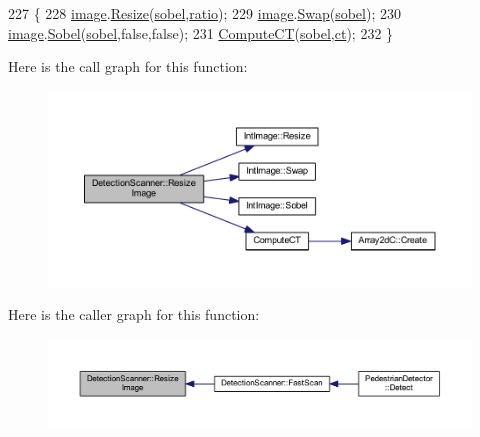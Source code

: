 \begin{DoxyCode}
227 \{
228     \mbox{\hyperlink{class_detection_scanner_aa4e4cfa6cc0a2ffd044c6cd9721a6b59}{image}}.\mbox{\hyperlink{class_int_image_a6eb852d06d8365476dba0760d9319e59}{Resize}}(\mbox{\hyperlink{class_detection_scanner_a03bc015aac34a51133881b760b929a6b}{sobel}},\mbox{\hyperlink{class_detection_scanner_a2ac93d1b6aca1959d57133c08b0eaa1c}{ratio}});
229     \mbox{\hyperlink{class_detection_scanner_aa4e4cfa6cc0a2ffd044c6cd9721a6b59}{image}}.\mbox{\hyperlink{class_int_image_adc366f59865cefd440c01996fd42d59a}{Swap}}(\mbox{\hyperlink{class_detection_scanner_a03bc015aac34a51133881b760b929a6b}{sobel}});
230     \mbox{\hyperlink{class_detection_scanner_aa4e4cfa6cc0a2ffd044c6cd9721a6b59}{image}}.\mbox{\hyperlink{class_int_image_a35b8a5c2e64fa3ab50d6b14973f368b8}{Sobel}}(\mbox{\hyperlink{class_detection_scanner_a03bc015aac34a51133881b760b929a6b}{sobel}},\textcolor{keyword}{false},\textcolor{keyword}{false});
231     \mbox{\hyperlink{c4-pedestrian-detector_8cpp_a205804b2ee8558313222a898513a9543}{ComputeCT}}(\mbox{\hyperlink{class_detection_scanner_a03bc015aac34a51133881b760b929a6b}{sobel}},\mbox{\hyperlink{class_detection_scanner_a885861d4c08a9f9ae4da36f68866419b}{ct}});
232 \}
\end{DoxyCode}
Here is the call graph for this function\+:\nopagebreak
\begin{figure}[H]
\begin{center}
\leavevmode
\includegraphics[width=350pt]{class_detection_scanner_a01790349ec7aef4ff03335d5e76f183a_cgraph}
\end{center}
\end{figure}
Here is the caller graph for this function\+:\nopagebreak
\begin{figure}[H]
\begin{center}
\leavevmode
\includegraphics[width=350pt]{class_detection_scanner_a01790349ec7aef4ff03335d5e76f183a_icgraph}
\end{center}
\end{figure}
\mbox{\label{class_detection_scanner_afc70267c30bdbef7a128b8e6d05d3d9a}} 
